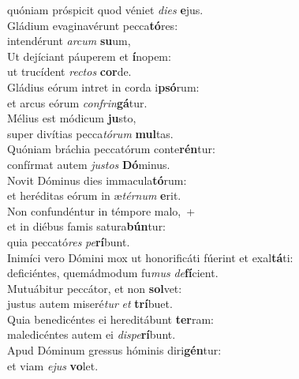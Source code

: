 \oddverse quóniam próspicit quod véniet \textit{di}\textit{es} \textbf{e}jus.\\
\evenverse Gládium evaginavérunt pecca\textbf{tó}res:~\*\\
\evenverse intendérunt \textit{ar}\textit{cum} \textbf{su}um,\\
\oddverse Ut dejíciant páuperem et \textbf{í}nopem:~\*\\
\oddverse ut trucídent \textit{re}\textit{ctos} \textbf{cor}de.\\
\evenverse Gládius eórum intret in corda i\textbf{psó}rum:~\*\\
\evenverse et arcus eórum \textit{con}\textit{frin}\textbf{gá}tur.\\
\oddverse Mélius est módicum \textbf{ju}sto,~\*\\
\oddverse super divítias pecca\textit{tó}\textit{rum} \textbf{mul}tas.\\
\evenverse Quóniam bráchia peccatórum conte\textbf{rén}tur:~\*\\
\evenverse confírmat autem \textit{ju}\textit{stos} \textbf{Dó}minus.\\
\oddverse Novit Dóminus dies immacula\textbf{tó}rum:~\*\\
\oddverse et heréditas eórum in æ\textit{tér}\textit{num} \textbf{e}rit.\\
\evenverse Non confundéntur in témpore malo,~+\\
\evenverse  et in diébus famis satura\textbf{bún}tur:~\*\\
\evenverse quia peccató\textit{res} \textit{pe}\textbf{rí}bunt.\\
\oddverse Inimíci vero Dómini mox ut honorificáti fúerint et exal\textbf{tá}ti:~\*\\
\oddverse deficiéntes, quemádmodum fu\textit{mus} \textit{de}\textbf{fí}cient.\\
\evenverse Mutuábitur peccátor, et non \textbf{sol}vet:~\*\\
\evenverse justus autem miseré\textit{tur} \textit{et} \textbf{trí}buet.\\
\oddverse Quia benedicéntes ei hereditábunt \textbf{ter}ram:~\*\\
\oddverse maledicéntes autem ei \textit{di}\textit{spe}\textbf{rí}bunt.\\
\evenverse Apud Dóminum gressus hóminis diri\textbf{gén}tur:~\*\\
\evenverse et viam \textit{e}\textit{jus} \textbf{vo}let.\\
